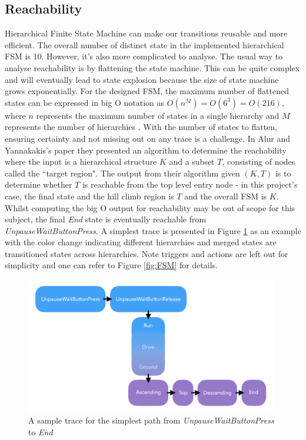 \subsection{Reachability}
Hierarchical Finite State Machine can make our transitions reusable and more efficient. The overall number of distinct state in the implemented hierarchical FSM is 10. However, it's also more complicated to analyse. The usual way to analyse reachability is by flattening the state machine. This can be quite complex and will eventually lead to state explosion because the size of state machine grows exponentially. For the designed FSM, the maximum number of flattened states can be expressed in big O notation as $O(n^M) = O(6^3) = O(216)$, where $n$ represents the maximum number of states in a single hierarchy and $M$ represents the number of hierarchies \cite{FSM}. With the number of states to flatten, ensuring certainty and not missing out on any trace is a challenge. In Alur and Yannakakis's paper \cite{FSM_reachability} they presented an algorithm to determine the reachability where the input is a hierarchical structure $K$ and a subset $T$, consisting of nodes called the ``target region"\cite{FSM_reachability}. The output from their algorithm given $(K,T)$ is to determine whether $T$ is reachable from the top level entry node - in this project's case, the final state and the hill climb region is $T$ and the overall FSM is $K$. Whilst computing the big O output for reachability may be out of scope for this subject, the final \textit{End} state is eventually reachable from \textit{UnpauseWaitButtonPress}. A simplest trace is presented in Figure \ref{fig:endtrace} as an example with the color change indicating different hierarchies and merged states are transitioned states across hierarchies. Note triggers and actions are left out for simplicity and one can refer to Figure \ref{fig:FSM} for details.
\begin{figure}[H]
    \centering
    \includegraphics[width=11cm]{Images/EndTrace.png}
    \caption{A sample trace for the simplest path from \textit{UnpauseWaitButtonPress} to \textit{End}}
    \label{fig:endtrace}
\end{figure}

